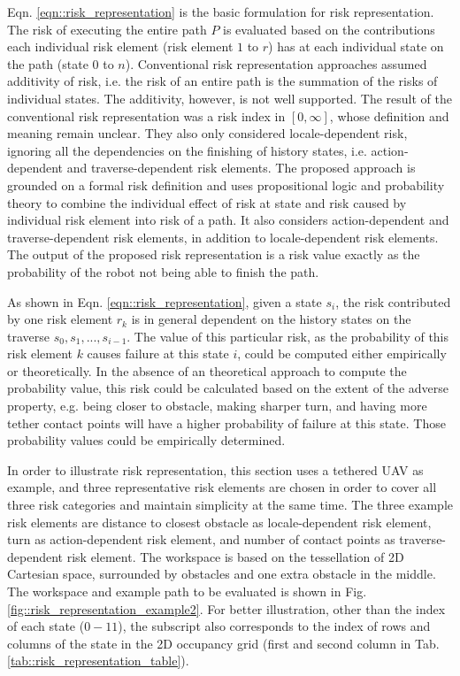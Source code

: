 \documentclass[letterpaper]{article} %
\begin{document}
Eqn. \ref{eqn::risk_representation} is the basic formulation for risk representation. The risk of executing the entire path $P$ is evaluated based on the contributions each individual risk element (risk element $1$ to $r$) has at each individual state on the path (state $0$ to $n$). Conventional risk representation approaches assumed additivity of risk, i.e. the risk of an entire path is the summation of the risks of individual states. The additivity, however, is not well supported. The result of the conventional risk representation was a risk index in $[0, \infty]$, whose definition and meaning remain unclear. They also only considered locale-dependent risk, ignoring all the dependencies on the finishing of history states, i.e. action-dependent and traverse-dependent risk elements. The proposed approach is grounded on a formal risk definition and uses propositional logic and probability theory to combine the individual effect of risk at state and risk caused by individual risk element into risk of a path. It also considers action-dependent and traverse-dependent risk elements, in addition to locale-dependent risk elements. The output of the proposed risk representation is a risk value exactly as the probability of the robot not being able to finish the path. 

As shown in Eqn. \ref{eqn::risk_representation}, given a state $s_i$, the risk contributed by one risk element $r_k$ is in general dependent on the history states on the traverse $s_0, s_1, ..., s_{i-1}$. The value of this particular risk, as the probability of this risk element $k$ causes failure at this state $i$, could be computed either empirically or theoretically. In the absence of an theoretical approach to compute the probability value, this risk could be calculated based on the extent of the adverse property, e.g. being closer to obstacle, making sharper turn, and having more tether contact points \cite{xiao2018motion} will have a higher probability of failure at this state. Those probability values could be empirically determined. 

In order to illustrate risk representation, this section uses a tethered UAV \cite{xiao2019autonomous} as example, and three representative risk elements are chosen in order to cover all three risk categories and maintain simplicity at the same time. The three example risk elements are distance to closest obstacle as locale-dependent risk element, turn as action-dependent risk element, and number of contact points as traverse-dependent risk element. The workspace is based on the tessellation of 2D Cartesian space, surrounded by obstacles and one extra obstacle in the middle. The workspace and example path to be evaluated is shown in Fig. \ref{fig::risk_representation_example2}. For better illustration, other than the index of each state ($0-11$), the subscript also corresponds to the index of rows and columns of the state in the 2D occupancy grid (first and second column in Tab. \ref{tab::risk_representation_table}). 
\end{document}
